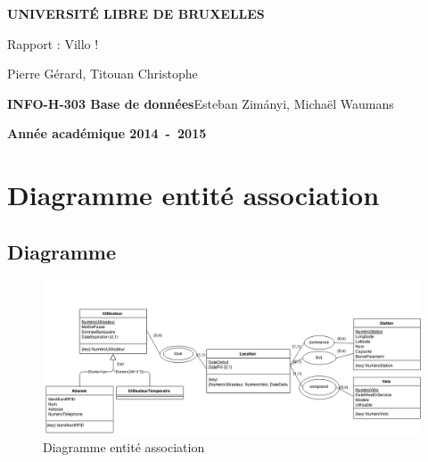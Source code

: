 \documentclass[a4paper,10pt]{article}
\begin{document}
\begin{titlepage}
\begin{center}
\textbf{\textsc{UNIVERSIT\'E LIBRE DE BRUXELLES}}\\
\vfill{}\vfill{}
\begin{center}{\Huge Rapport : Villo !}\end{center}{\Huge \par}
\begin{center}{\large Pierre Gérard, Titouan Christophe}\end{center}{\Huge \par}
\vfill{}\vfill{} \vfill{}
\begin{flushleft}{\large \textbf{INFO-H-303 Base de données}}\hfill{Esteban Zimányi, Michaël Waumans}\end{flushleft}{\large\par}
\vfill{}\vfill{}\enlargethispage{3cm}
\textbf{Année académique 2014~-~2015}
\end{center}
\end{titlepage}



\tableofcontents

\pagebreak


\section{Diagramme entité association}
\subsection{Diagramme}
\begin{figure}[hbt]
  \includegraphics[scale=0.4]{dia/diagramme-entite-association.png}
  \caption{Diagramme entité association
}
\end{figure}
\end{document}
